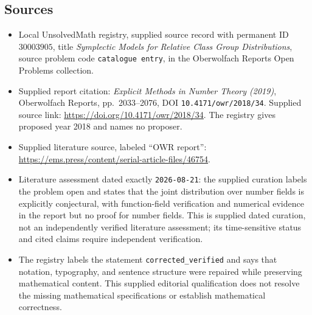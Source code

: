 \documentclass[11pt]{article}
\begin{document}
\subsection{Sources}
\begin{itemize}
\item Local UnsolvedMath registry, supplied source record with permanent ID \(30003905\), title \emph{Symplectic Models for Relative Class Group Distributions}, source problem code \texttt{catalogue entry}, in the Oberwolfach Reports Open Problems collection.
\item Supplied report citation: \emph{Explicit Methods in Number Theory (2019)}, Oberwolfach Reports, pp.\ 2033--2076, DOI \texttt{10.4171/owr/2018/34}. Supplied source link: \url{https://doi.org/10.4171/owr/2018/34}. The registry gives proposed year 2018 and names no proposer.
\item Supplied literature source, labeled ``OWR report'': \url{https://ems.press/content/serial-article-files/46754}.
\item Literature assessment dated exactly \texttt{2026-08-21}: the supplied curation labels the problem open and states that the joint distribution over number fields is explicitly conjectural, with function-field verification and numerical evidence in the report but no proof for number fields. This is supplied dated curation, not an independently verified literature assessment; its time-sensitive status and cited claims require independent verification.
\item The registry labels the statement \texttt{corrected\_verified} and says that notation, typography, and sentence structure were repaired while preserving mathematical content. This supplied editorial qualification does not resolve the missing mathematical specifications or establish mathematical correctness.
\end{itemize}
\end{document}
